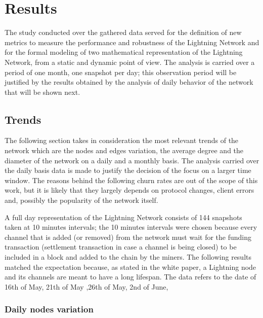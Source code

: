 
	\chapter{Results}
	
	The study conducted over the gathered data served for the definition of new metrics to measure the performance and robustness of the Lightning Network and for the formal modeling of two mathematical representation of the Lightning Network, from a static and dynamic point of view. The analysis is carried over a period of one month, one snapshot per day; this observation period will be justified by the results obtained by the analysis of daily behavior of the network that will be shown next.
	
	\section{Trends}
	
	The following section takes in consideration the most relevant trends of the network which are the nodes and edges variation, the average degree and the diameter of the network on a daily and a monthly basis. The analysis carried over the daily basis data is made to justify the decision of the focus on a larger time window. The reasons behind the following churn rates are out of the scope of this work, but it is likely that they largely depends on protocol changes, client errors and, possibly the popularity of the network itself.
	
	A full day representation of the Lightning Network consists of 144 snapshots taken at 10 minutes intervals; the 10 minutes intervals were chosen because every channel that is added (or removed) from the network must wait for the funding transaction (settlement transaction in case a channel is being closed) to be included in a block and added to the chain by the miners. The following results matched the expectation because, as stated in the white paper, a Lightning node and its channels are meant to have a long lifespan. The data refers to the date of 16th of May, 21th of May ,26th of May, 2nd of June, 
	
	\subsection{Daily nodes variation}
	
